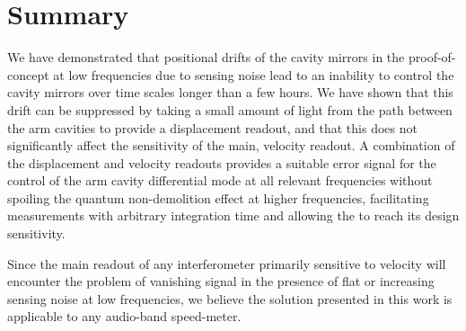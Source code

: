 \section{\label{sec:summary}Summary}

We have demonstrated that positional drifts of the cavity mirrors in the proof-of-concept \SSM{} at low frequencies due to sensing noise lead to an inability to control the cavity mirrors over time scales longer than a few hours. We have shown that this drift can be suppressed by taking a small amount of light from the path between the arm cavities to provide a displacement readout, and that this does not significantly affect the sensitivity of the main, velocity readout. A combination of the displacement and velocity readouts provides a suitable error signal for the control of the arm cavity differential mode at all relevant frequencies without spoiling the quantum non-demolition effect at higher frequencies, facilitating measurements with arbitrary integration time and allowing the \SSM{} to reach its design sensitivity.

Since the main readout of any interferometer primarily sensitive to velocity will encounter the problem of vanishing signal in the presence of flat or increasing sensing noise at low frequencies, we believe the solution presented in this work is applicable to any audio-band speed-meter.